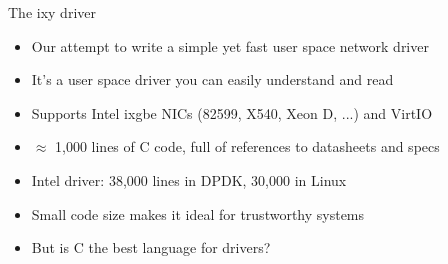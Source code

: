 \documentclass[NET,english,aspectratio=169,notitleframe]{tumbeamer}
\begin{document}
\begin{frame}{The ixy driver}
\begin{itemize}
\item Our attempt to write a simple yet fast user space network driver
\item It's a user space driver you can easily understand and read
\item Supports Intel ixgbe NICs (82599, X540, Xeon D, ...) and VirtIO 
\item $\approx$ 1,000 lines of C code, full of references to datasheets and specs
\item Intel driver: 38,000 lines in DPDK, 30,000 in Linux
\item Small code size makes it ideal for trustworthy systems
\vspace{1ex}
\item But is C the best language for drivers?
\end{itemize}
\end{frame}
\end{document}
